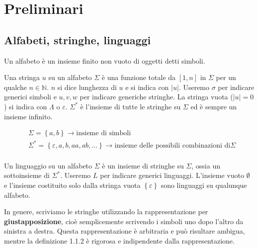 \documentclass[12pt, a4paper]{report}
\begin{document}
    \newpage
    \tableofcontents
    \chapter{Preliminari}
        \section{Alfabeti, stringhe, linguaggi}
            \begin{definition}[Alfabeto]
                Un alfabeto è un insieme finito non vuoto di oggetti detti simboli.
            \end{definition}
            \begin{definition}[Stringa]
                Una stringa $u$ su un alfabeto $\Sigma$ è una funzione totale da $\left[1,n\right]$ in $\Sigma$ per un qualche $n \in \mathbb{N}$. $n$ si dice lunghezza di $u$ e si indica con $|u|$. Useremo $\sigma$ per indicare generici simboli e $u,v,w$ per indicare generiche stringhe. La stringa vuota ($|u|=0$) si indica con $\Lambda$ o $\varepsilon$. $\Sigma^{*}$ è l'insieme di tutte le stringhe su $\Sigma$ ed è sempre un insieme infinito.
            \end{definition}
            \begin{equation*}
                \begin{split}
                    &\Sigma = \left\{a,b\right\} \rightarrow  \text{insieme di simboli}\\
                    &\Sigma^{*} = \left\{\varepsilon,a,b,aa,ab,\ldots\right\} \rightarrow \text{insieme delle possibili combinazioni di} \Sigma\\
                \end{split}
            \end{equation*}
            \begin{definition}[Linguaggio]
                Un linguaggio su un alfabeto $\Sigma$ è un insieme di stringhe su $\Sigma$, ossia un sottoinsieme di $\Sigma^{*}$. Useremo $L$ per indicare generici linguaggi. L'insieme vuoto $\emptyset$ e l'insieme costituito solo dalla stringa vuota $\left\{\varepsilon\right\}$ sono linguaggi su qualunque alfabeto.
            \end{definition}
            In genere, scriviamo le stringhe utilizzando la rappresentazione per \textbf{giustapposizione}, cioè  semplicemente scrivendo i simboli uno dopo l'altro da sinistra a destra. Questa rappresentazione è arbitraria e può risultare  ambigua, mentre la definizione 1.1.2 è rigorosa e indipendente dalla rappresentazione.
\end{document}
